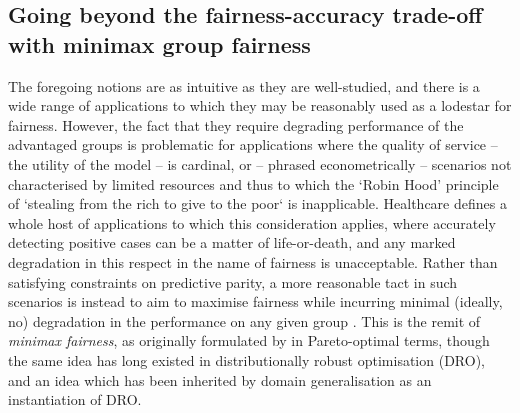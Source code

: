 \subsection{Going beyond the fairness-accuracy trade-off with minimax group
fairness}\label{ssec:minimax-fairness}
The foregoing notions are as intuitive as they are well-studied, and there is a wide
range of applications to which they may be reasonably used as a lodestar for fairness.
%
However, the fact that they require degrading performance of the advantaged groups is problematic
for applications where the quality of service -- the utility of the model -- is cardinal, or --
phrased econometrically -- scenarios not characterised by limited resources  and thus to which the
`Robin Hood' principle of `stealing from the rich to give to the poor` is inapplicable.
%
Healthcare defines a whole host of applications to which this consideration applies, where
accurately detecting positive cases can be a matter of life-or-death, and any marked degradation in
this respect in the name of fairness is unacceptable. 
%
Rather than satisfying constraints on predictive parity, a more reasonable tact in such scenarios
is instead to aim to maximise fairness while incurring minimal (ideally, no) degradation in the
performance on any given group \citep{ustun2019fairness}.
%
This is the remit of \emph{minimax fairness}, as originally formulated by
\citep{martinez2020minimax} in Pareto-optimal terms, though the same idea has long existed in
distributionally robust optimisation (DRO), and an idea which has been inherited by domain
generalisation as an instantiation of DRO. 
%

